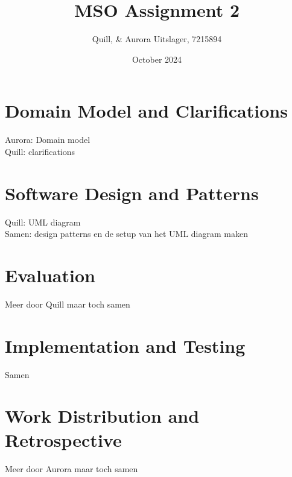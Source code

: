 \documentclass{article}
\title{MSO Assignment 2}
\author{Quill, \& Aurora Uitslager, 7215894}
\date{October 2024}
\begin{document}
\maketitle

\section{Domain Model and Clarifications}
Aurora: Domain model\\
Quill: clarifications

\section{Software Design and Patterns}
Quill: UML diagram\\
Samen: design patterns en de setup van het UML diagram maken

\section{Evaluation}
Meer door Quill maar toch samen

\section{Implementation and Testing}
Samen

\section{Work Distribution and Retrospective}
Meer door Aurora maar toch samen
\end{document}
